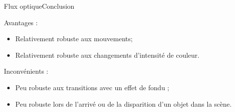 \begin{frame}{Flux optique}{Conclusion}

\begin{block}{Avantages :}

\begin{itemize}
	\item Relativement robuste aux mouvements;
	\item Relativement robuste aux changements d'intensité de couleur.
\end{itemize}

\end{block}

\begin{block}{Inconvénients :}

\begin{itemize}
	\item Peu robuste aux transitions avec un effet de fondu ;
	\item Peu robuste lors de l'arrivé ou de la disparition d'un objet dans la scène.
\end{itemize}

\end{block}

\end{frame}
